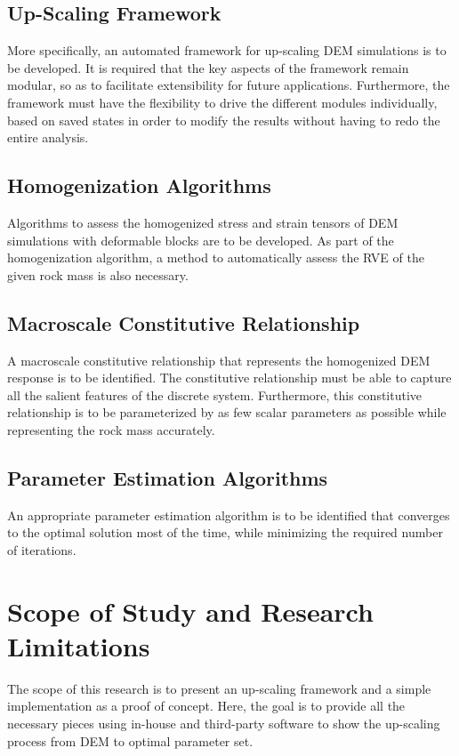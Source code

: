 \subsection*{Up-Scaling Framework}
More specifically, an automated framework for up-scaling DEM simulations is to be developed. It is required that the key aspects of the framework remain modular, so as to facilitate extensibility for future applications. Furthermore, the framework must have the flexibility to drive the different modules individually, based on saved states in order to modify the results without having to redo the entire analysis.

\subsection*{Homogenization Algorithms}
Algorithms to assess the homogenized stress and strain tensors of DEM simulations with deformable blocks are to be developed. As part of the homogenization algorithm, a method to automatically assess the RVE of the given rock mass is also necessary.

\subsection*{Macroscale Constitutive Relationship}
A macroscale constitutive relationship that represents the homogenized DEM response is to be identified. The constitutive relationship must be able to capture all the salient features of the discrete system. Furthermore, this constitutive relationship is to be parameterized by as few scalar parameters as possible while representing the rock mass accurately.

\subsection*{Parameter Estimation Algorithms}
An appropriate parameter estimation algorithm is to be identified that converges to the optimal solution most of the time, while minimizing the required number of iterations. 

\section{Scope of Study and Research Limitations}
The scope of this research is to present an up-scaling framework and a simple implementation as a proof of concept. Here, the goal is to provide all the necessary pieces using in-house and third-party software to show the up-scaling process from DEM to optimal parameter set. 

